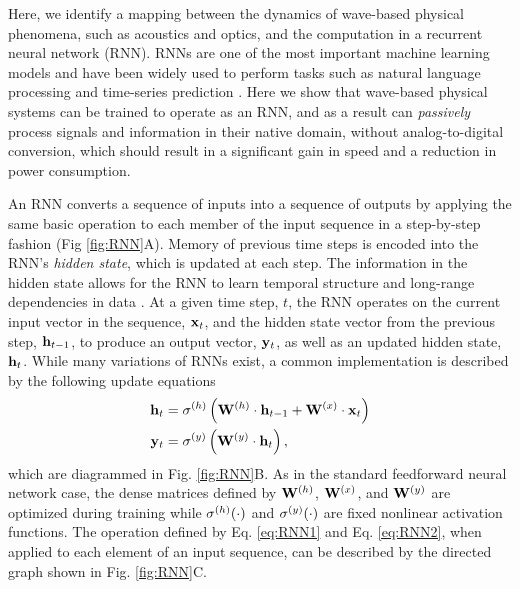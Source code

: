 Here, we identify a mapping between the dynamics of wave-based physical phenomena, such as acoustics and optics, and the computation in a recurrent neural network (RNN).
RNNs are one of the most important machine learning models and have been widely used to perform tasks such as natural language processing \cite{yao2013recurrent} and time-series prediction \cite{husken_recurrent_2003, dorffner_neural_1996, connor_recurrent_1994}.
Here we show that wave-based physical systems can be trained to operate as an RNN, and as a result can \textit{passively} process signals and information in their native domain, without analog-to-digital conversion, which should result in a significant gain in speed and a reduction in power consumption.

An RNN converts a sequence of inputs into a sequence of outputs by applying the same basic operation to each member of the input sequence in a step-by-step fashion (Fig \ref{fig:RNN}A). 
Memory of previous time steps is encoded into the RNN's \textit{hidden state}, which is updated at each step.
The information in the hidden state allows for the RNN to learn temporal structure and long-range dependencies in data \cite{elman1990finding, jordan1997serial}.
At a given time step, $t$, the RNN operates on the current input vector in the sequence, $\mathbf{x}_t$, and the hidden state vector from the previous step, $\mathbf{h}_{t-1}$, to produce an output vector, $\mathbf{y}_t$, as well as an updated hidden state, $\mathbf{h}_t$. 
%
While many variations of RNNs exist, a common implementation \cite{goodfellow2016deep} is described by the following update equations
%
\begin{align}
    \mathbf{h}_t &= \sigma^{(h)} \left(\mathbf{W}^{(h)} \cdot \mathbf{h}_{t-1} + \mathbf{W}^{(x)} \cdot \mathbf{x}_t \right)
    \label{eq:RNN1} \\
    \mathbf{y}_t &= \sigma^{(y)} \left(\mathbf{W}^{(y)} \cdot \mathbf{h}_t\right),
    \label{eq:RNN2}
\end{align}
%
which are diagrammed in Fig. \ref{fig:RNN}B. 
As in the standard feedforward neural network case, the dense matrices defined by $\mathbf{W}^{(h)}$, $\mathbf{W}^{(x)}$, and $\mathbf{W}^{(y)}$ are optimized during training while $\sigma^{(h)}{\left(\cdot \right)}$ and $\sigma^{(y)}{\left(\cdot \right)}$ are fixed nonlinear activation functions.
The operation defined by Eq. \ref{eq:RNN1} and Eq. \ref{eq:RNN2}, when applied to each element of an input sequence, can be described by the directed graph shown in Fig. \ref{fig:RNN}C.

